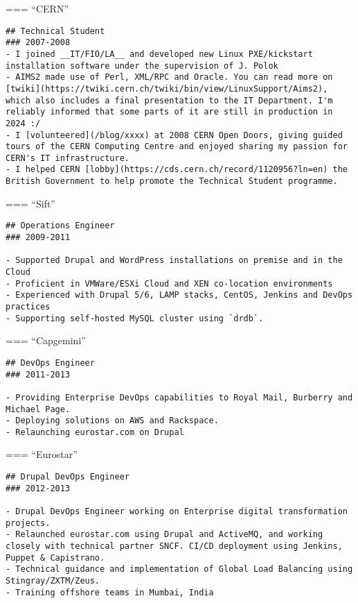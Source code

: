 \documentclass[
]{article}
\begin{document}
=== ``CERN''

\begin{verbatim}
## Technical Student 
### 2007-2008
- I joined __IT/FIO/LA__ and developed new Linux PXE/kickstart installation software under the supervision of J. Polok
- AIMS2 made use of Perl, XML/RPC and Oracle. You can read more on [twiki](https://twiki.cern.ch/twiki/bin/view/LinuxSupport/Aims2), which also includes a final presentation to the IT Department. I'm reliably informed that some parts of it are still in production in 2024 :/
- I [volunteered](/blog/xxxx) at 2008 CERN Open Doors, giving guided tours of the CERN Computing Centre and enjoyed sharing my passion for CERN's IT infrastructure.
- I helped CERN [lobby](https://cds.cern.ch/record/1120956?ln=en) the British Government to help promote the Technical Student programme.
\end{verbatim}

=== ``Sift''

\begin{verbatim}
## Operations Engineer
### 2009-2011

- Supported Drupal and WordPress installations on premise and in the Cloud
- Proficient in VMWare/ESXi Cloud and XEN co-location environments
- Experienced with Drupal 5/6, LAMP stacks, CentOS, Jenkins and DevOps practices
- Supporting self-hosted MySQL cluster using `drdb`.
\end{verbatim}

=== ``Capgemini''

\begin{verbatim}
## DevOps Engineer
### 2011-2013

- Providing Enterprise DevOps capabilities to Royal Mail, Burberry and Michael Page.
- Deploying solutions on AWS and Rackspace.
- Relaunching eurostar.com on Drupal
\end{verbatim}

=== ``Eurostar''

\begin{verbatim}
## Drupal DevOps Engineer
### 2012-2013

- Drupal DevOps Engineer working on Enterprise digital transformation projects.
- Relaunched eurostar.com using Drupal and ActiveMQ, and working closely with technical partner SNCF. CI/CD deployment using Jenkins, Puppet & Capistrano.
- Technical guidance and implementation of Global Load Balancing using Stingray/ZXTM/Zeus.
- Training offshore teams in Mumbai, India
\end{verbatim}
\end{document}
